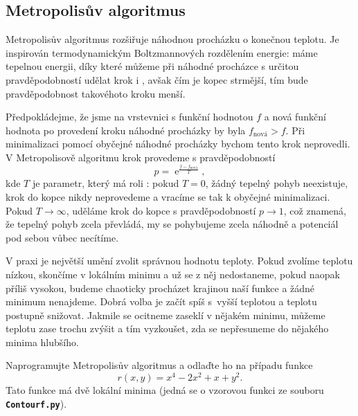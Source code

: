 \documentclass[a4paper,11pt,twoside]{article}
\DeclareMathOperator{\e}{e}
\def\file#1{\textnormal{\textbf{\texttt{#1}}}}
\begin{document}
    \subsection{Metropolisův algoritmus}
        Metropolisův algoritmus rozšiřuje náhodnou procházku o konečnou teplotu.
        Je inspirován termodynamickým Boltzmannových rozdělením energie: 
        máme tepelnou energii, díky které můžeme při náhodné procházce s určitou pravděpodobností udělat krok i , avšak čím je kopec strmější, tím bude pravděpodobnost takovéhoto kroku menší.
        
        Předpokládejme, že jsme na vrstevnici s funkční hodnotou $f$ a nová funkční hodnota po provedení kroku náhodné procházky by byla $f_{\text{nová}}>f$.
        Při minimalizaci pomocí obyčejné náhodné procházky bychom tento krok neprovedli.
        V Metropolisově algoritmu krok provedeme s pravděpodobností
        \begin{equation}
            p=\e^{\frac{f-f_{\text{nová}}}{T}},
        \end{equation}
        kde $T$ je parametr, který má roli : pokud $T=0$, žádný tepelný pohyb neexistuje, krok do kopce nikdy neprovedeme a vracíme se tak k obyčejné minimalizaci.
        Pokud $T\rightarrow\infty$, uděláme krok do kopce s pravděpodobností $p\rightarrow1$,
        což znamená, že tepelný pohyb zcela převládá, my se pohybujeme zcela náhodně a potenciál pod sebou vůbec necítíme.
        
        V praxi je největší umění zvolit správnou hodnotu teploty.
        Pokud zvolíme teplotu nízkou, skončíme v lokálním minimu a už se z něj nedostaneme, pokud naopak příliš vysokou, budeme chaoticky procházet krajinou naší funkce a žádné minimum nenajdeme.
        Dobrá volba je začít spíš s~vyšší teplotou a teplotu postupně snižovat.
        Jakmile se ocitneme zaseklí v nějakém minimu, můžeme teplotu zase trochu zvýšit a tím vyzkoušet, zda se nepřesuneme do nějakého minima hlubšího.

        \begin{task}
            Naprogramujte Metropolisův algoritmus a odlaďte ho na případu funkce
            \begin{equation}\label{eq:Minimizer}
                r(x,y)=x^{4}-2x^{2}+x+y^{2}.
            \end{equation}
            Tato funkce má dvě lokální minima (jedná se o vzorovou funkci ze souboru \file{Contourf.py}).
        \end{task}
\end{document}
